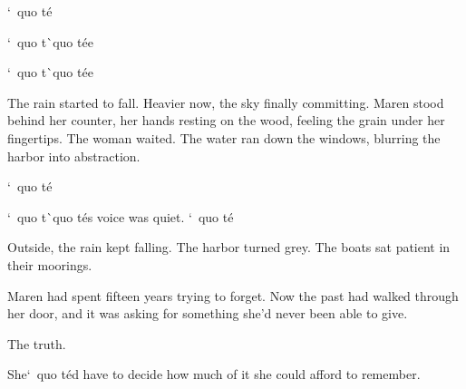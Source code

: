 \documentclass[12pt,letterpaper,openany]{book}
\begin{document}
\par
`\ quo t\'e{}
\par
`\ quo t\`\ quo t\'e{}e{}
\par
`\ quo t\`\ quo t\'e{}e{}
\par
The rain started to fall. Heavier now, the sky finally committing. Maren stood behind her counter, her hands resting on the wood, feeling the grain under her fingertips. The woman waited. The water ran down the windows, blurring the harbor into abstraction.
\par
`\ quo t\'e{}
\par
`\ quo t\`\ quo t\'e{}s voice was quiet. `\ quo t\'e{}
\par
Outside, the rain kept falling. The harbor turned grey. The boats sat patient in their moorings.
\par
Maren had spent fifteen years trying to forget. Now the past had walked through her door, and it was asking for something she'd never been able to give.
\par
The truth.
\par
She`\ quo t\'e{}d have to decide how much of it she could afford to remember.
\par
\end{document}

